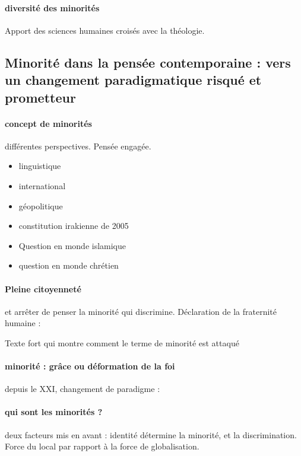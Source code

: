 \paragraph{diversité des minorités} Apport des sciences humaines croisés avec la théologie. 

\subsection{Minorité dans la pensée contemporaine : vers un changement paradigmatique risqué et prometteur }
\paragraph{concept de minorités} différentes perspectives. Pensée engagée.

\begin{itemize}
\item linguistique
\item international
\item géopolitique
\item constitution irakienne de 2005
\item Question en monde islamique
\item question en monde chrétien
\end{itemize}

\paragraph{Pleine citoyenneté} et arrêter de penser la minorité qui discrimine. 
Déclaration de la fraternité humaine : 
\begin{quote}
\end{quote}
Texte fort qui montre comment le terme de minorité est attaqué

\paragraph{minorité : grâce ou déformation de la foi} depuis le XXI, changement de paradigme : 

\paragraph{qui sont les minorités ?} deux facteurs mis en avant : identité détermine la minorité, et la discrimination. Force du local par rapport à la force de globalisation.

